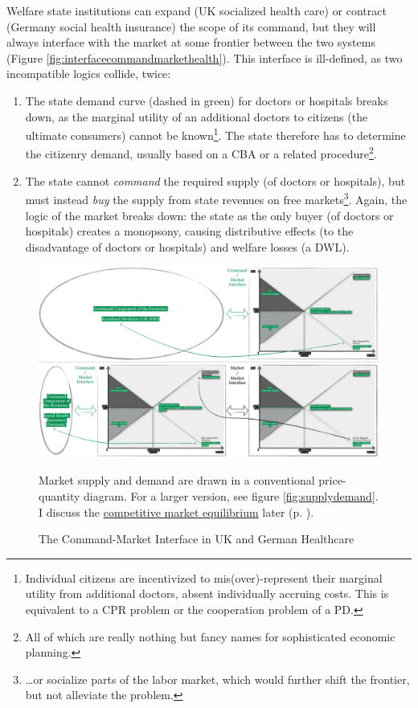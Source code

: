 Welfare state institutions can expand (UK socialized health care) or contract (Germany social health insurance) the scope of its command, but they will always interface with the market at some frontier between the two systems (Figure \ref{fig:interfacecommandmarkethealth}). This interface is ill-defined, as two incompatible logics collide, twice: 
\begin{enumerate}
	\item The state demand curve (dashed in green) for doctors or hospitals breaks down, as the marginal utility of an additional doctors to citizens (the ultimate consumers) cannot be known\footnote
		{Individual citizens are incentivized to mis(over)-represent their marginal utility from additional doctors, absent individually accruing costs. This is equivalent to a \gls{CPR} problem or the cooperation problem of a \gls{PD}.}. 
	The state therefore has to determine the citizenry demand, usually based on a \gls{CBA} or a related procedure\footnote
		{All of which are really nothing but fancy names for sophisticated economic planning.}. 
	\item The state cannot \emph{command} the required supply (of doctors or hospitals), but must instead \emph{buy} the supply from state revenues on free markets\footnote
		{\ldots or socialize parts of the labor market, which would further shift the frontier, but not alleviate the problem.}. 
	Again, the logic of the market breaks down: the state as the only buyer (of doctors or hospitals) creates a monopsony, causing distributive effects (to the disadvantage of doctors or hospitals) and welfare losses (a \gls{DWL}).
\end{enumerate}

\begin{landscape}
 \begin{figure}[htbp]
	\begin{center}
	\includegraphics[width=1\textheight]{./img/interface-command-market-health}  
	\caption[Command-Market Interface in UK and German Healthcare]{The Command-Market Interface in UK and German Healthcare}
	\label{fig:interface-command-market-health}
	\end{center}
	\scriptsize{Market supply and demand are drawn in a conventional price-quantity diagram. For a larger version, see figure \ref{fig:supplydemand}. I discuss the \hyperref[sec:market-solutions-production]{competitive market equilibrium} later (p. \pageref{sec:market-solutions-production}).}
\end{figure}
\end{landscape}

